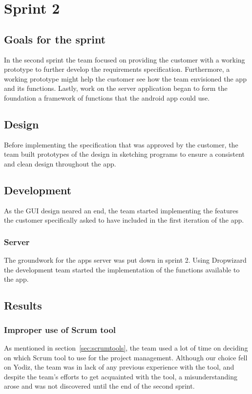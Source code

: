 \section{Sprint 2}

\subsection{Goals for the sprint}
In the second sprint the team focused on providing the customer with a working prototype to further develop the requirements specification. Furthermore, a working prototype might help the customer see how the team envisioned the app and its functions. Lastly, work on the server application began to form the foundation a framework of functions that the android app could use.

\subsection{Design}
Before implementing the specification that was approved by the customer, the team built prototypes of the design in sketching programs to ensure a consistent and clean design throughout the app. 

\subsection{Development}
As the GUI design neared an end, the team started implementing the features the customer specifically asked to have included in the first iteration of the app.

\subsubsection{Server}
The groundwork for the apps server was put down in sprint 2. Using Dropwizard the development team started the implementation of the functions available to the app.

\subsection{Results}

\subsubsection{Improper use of Scrum tool}
As mentioned in section~\ref{sec:scrumtools}, the team used a lot of time on deciding on which Scrum tool to use for the project management. Although our choice fell on Yodiz, the team was in lack of any previous experience with the tool, and despite the team's efforts to get acquainted with the tool, a misunderstanding arose and was not discovered until the end of the second sprint.

